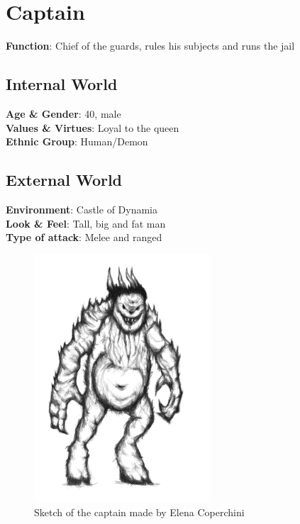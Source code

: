 \section{Captain}

\begin{minipage}{0.5\textwidth}
\textbf{Function}: Chief of the guards, rules his subjects and runs the jail

\subsection{Internal World}

\textbf{Age \& Gender}: 40, male \\
\textbf{Values \& Virtues}: Loyal to the queen\\
\textbf{Ethnic Group}: Human/Demon

\subsection{External World}
\textbf{Environment}: Castle of Dynamia \\
\textbf{Look \& Feel}: Tall, big and fat man\\
\textbf{Type of attack}: Melee and ranged \\
\end{minipage}%
%
\hfill\begin{minipage}{0.4\textwidth}
  \begin{figure}[H]
  \includegraphics{Images/Enemies/captain_portrait}
   \caption{Sketch of the captain made by Elena Coperchini}
  \end{figure}
\end{minipage}

